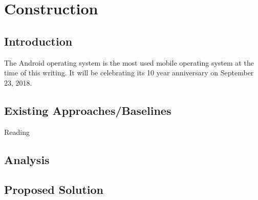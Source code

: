 
\chapter{Construction} %
\label{Chapter3}

\section{Introduction}
 The Android operating system is the most used mobile operating system at the time of this writing. It will be celebrating its 10 year anniversary on September 23, 2018\cite{android_developers_blog_2008}.
 

\section{Existing Approaches/Baselines}
Reading \cite  {SoftwE}
\section{Analysis}
\section{Proposed Solution}
